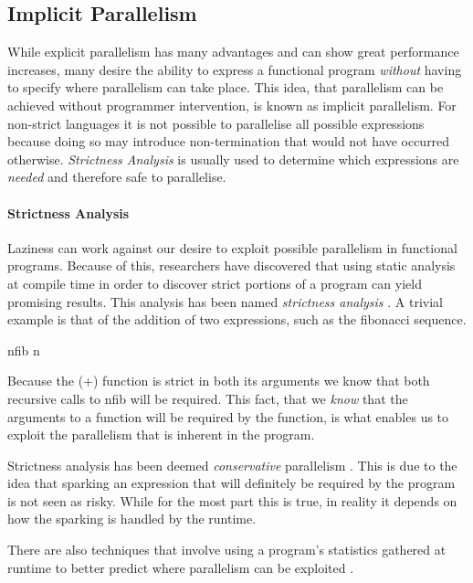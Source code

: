 \subsection{Implicit Parallelism}

While explicit parallelism has many advantages and can show great performance
increases, many desire the ability to express a functional program
\emph{without} having to specify where parallelism can take place. This idea,
that parallelism can be achieved without programmer intervention, is known as
implicit parallelism. For non-strict languages it is not possible to
parallelise all possible expressions because doing so may introduce
non-termination that would not have occurred otherwise. \emph{Strictness
Analysis} is usually used to determine which expressions are \emph{needed} and
therefore safe to parallelise.

  \paragraph{Strictness Analysis}
    Laziness can work against our desire to exploit possible parallelism in
functional programs. Because of this, researchers have discovered that using
static analysis at compile time in order to discover strict portions of a
program can yield promising results. This analysis has been named
\emph{strictness analysis} \citep{ritabook, SPJ:PIFPL}. A trivial example is that
of the addition of two expressions, such as the fibonacci sequence.

\begin{haskell}
nfib n 
\end{haskell}

Because the \<(+)\> function is strict in both its arguments we know that
both recursive calls to \<nfib\> will be required. This fact, that we
\emph{know} that the arguments to a function will be required by the function,
is what enables us to exploit the parallelism that is inherent in the program.

    Strictness analysis has
been deemed \emph{conservative} parallelism \citep{SPJ:PIFPL}. This is due to
the idea that sparking an expression that will definitely be required by the
program is not seen as risky. While for the most part this is true, in reality
it depends on how the sparking is handled by the runtime.

    There are also techniques that involve using a program's statistics
    gathered at runtime to better predict where parallelism can be exploited
    \citep{feedbackImplicit}.


